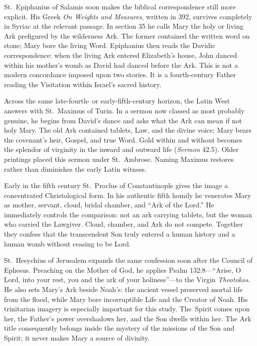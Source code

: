 St.~Epiphanius of Salamis soon makes the biblical correspondence still more
explicit. His Greek \emph{On Weights and Measures}, written in 392, survives
completely in Syriac at the relevant passage. In section 35 he calls Mary the
holy or living Ark prefigured by the wilderness Ark. The former contained the
written word on stone; Mary bore the living Word. Epiphanius then reads the
Davidic correspondence: when the living Ark entered Elizabeth's house, John
danced within his mother's womb as David had danced before the Ark. This is not
a modern concordance imposed upon two stories. It is a fourth-century Father
reading the Visitation within Israel's sacred history.

Across the same late-fourth- or early-fifth-century horizon, the Latin West
answers with St.~Maximus of Turin. In a sermon now classed as most probably
genuine, he begins from David's dance and asks what the Ark can mean if not holy
Mary. The old Ark contained tablets, Law, and the divine voice; Mary bears the
covenant's heir, Gospel, and true Word. Gold within and without becomes the
splendor of virginity in the inward and outward life (\emph{Sermon} 42.5).
Older printings placed this sermon under St.~Ambrose. Naming Maximus restores
rather than diminishes the early Latin witness.

Early in the fifth century St.~Proclus of Constantinople gives the image a
concentrated Christological form. In his authentic fifth homily he venerates
Mary as mother, servant, cloud, bridal chamber, and ``Ark of the Lord.'' He
immediately controls the comparison: not an ark carrying tablets, but the woman
who carried the Lawgiver. Cloud, chamber, and Ark do not compete. Together they
confess that the transcendent Son truly entered a human history and a human
womb without ceasing to be Lord.

St.~Hesychius of Jerusalem expands the same confession soon after the Council
of Ephesus. Preaching on the Mother of God, he applies Psalm 132:8---``Arise,
O Lord, into your rest, you and the ark of your holiness''---to the Virgin
\emph{Theotokos}. He also sets Mary's Ark beside Noah's: the ancient vessel
preserved mortal life from the flood, while Mary bore incorruptible Life and
the Creator of Noah. His trinitarian imagery is especially important for this
study. The~Spirit comes upon her, the Father's power overshadows her, and the
Son dwells within her. The Ark title consequently belongs inside the mystery of
the missions of the Son and Spirit; it never makes Mary a source of divinity.

